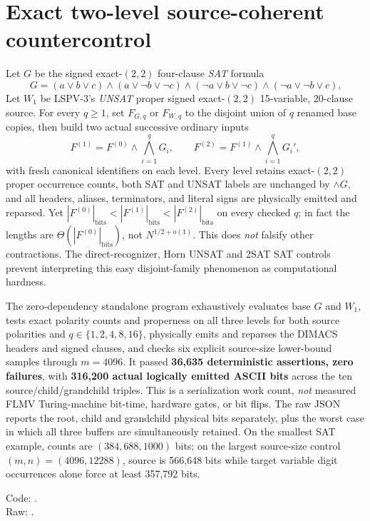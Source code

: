 \documentclass[11pt]{article}
\begin{document}
\section{Exact two-level source-coherent countercontrol}
Let $G$ be the signed exact-$(2,2)$ four-clause \emph{SAT} formula
\[
G=(a\vee b\vee c)\wedge(a\vee\neg b\vee\neg c)
\wedge(\neg a\vee b\vee\neg c)\wedge
(\neg a\vee\neg b\vee c).
\]
Let $W_1$ be LSPV-3's \emph{UNSAT} proper signed exact-$(2,2)$ 15-variable, 20-clause source. For every $q\ge1$, set $F_{G,q}$ or $F_{W,q}$ to the disjoint union of $q$ renamed base copies, then build two actual successive ordinary inputs
\[
F^{(1)}=F^{(0)}\wedge \bigwedge_{i=1}^qG_i,\qquad
F^{(2)}=F^{(1)}\wedge \bigwedge_{i=1}^qG_i',
\]
with fresh canonical identifiers on each level. Every level retains exact-$(2,2)$ proper occurrence counts, both SAT and UNSAT labels are unchanged by $\wedge G$, and all headers, aliases, terminators, and literal signs are physically emitted and reparsed. Yet
$|F^{(0)}|_{\mathrm{bits}}<|F^{(1)}|_{\mathrm{bits}}<|F^{(2)}|_{\mathrm{bits}}$ on every checked $q$; in fact the lengths are $\Theta(|F^{(0)}|_{\mathrm{bits}})$, not $N^{1/2+o(1)}$. This does \emph{not} falsify other contractions. The direct-recognizer, Horn UNSAT and 2SAT SAT controls prevent interpreting this easy disjoint-family phenomenon as computational hardness.

The zero-dependency standalone program exhaustively evaluates base $G$ and $W_1$, tests exact polarity counts and properness on all three levels for both source polarities and $q\in\{1,2,4,8,16\}$, physically emits and reparses the DIMACS headers and signed clauses, and checks six explicit source-size lower-bound samples through $m=4096$. It passed \textbf{36,635 deterministic assertions, zero failures}, with \textbf{316,200 actual logically emitted ASCII bits} across the ten source/child/grandchild triples. This is a serialization work count, \emph{not} measured FLMV Turing-machine bit-time, hardware gates, or bit flips. The raw JSON reports the root, child and grandchild physical bits separately, plus the worst case in which all three buffers are simultaneously retained. On the smallest SAT example, counts are $(384,688,1000)$ bits; on the largest source-size control $(m,n)=(4096,12288)$, source is 566,648 bits while target variable digit occurrences alone force at least 357,792 bits.

\noindent Code: .\\
Raw: .
\end{document}
